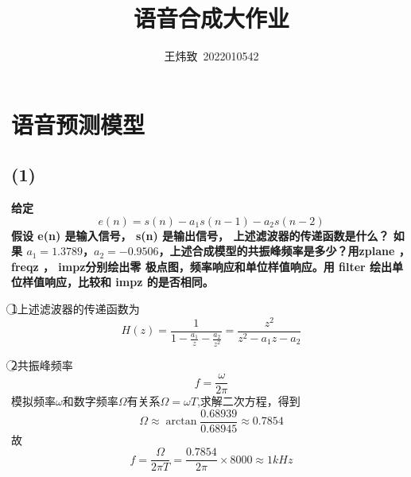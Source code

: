 \documentclass[10pt]{article}
\title{语音合成大作业}
\author{王炜致\ 2022010542}
\date{}
\begin{document}
\maketitle
\section{语音预测模型}
\subsection*{(1)}
\textbf{\color{gray}
给定$$e(n) = s(n) - a_1s(n - 1) - a_2s(n - 2)$$
假设 e(n) 是输入信号， s(n) 是输出信号， 上述滤波器的传递函数是什么？ 如果 $a_1 = 1.3789
$，$a_2 = -0.9506$，上述合成模型的共振峰频率是多少？用zplane ， freqz ， impz分别绘出零
极点图，频率响应和单位样值响应。用 filter 绘出单位样值响应，比较和 impz 的是否相同。}

\textcircled{1}上述滤波器的传递函数为$$H(z)=\frac{1}{1-\frac{a_1}{z}-\frac{a_2}{z^2}} 
=\frac{z^2}{z^2-a_1z-a_2}$$

\textcircled{2}共振峰频率$$f=\frac{\omega}{2\pi}$$
模拟频率$\omega$和数字频率$\Omega$有关系$\Omega=\omega T$,求解二次方程，得到$$\Omega\approx \arctan\frac{0.68939}{0.68945}\approx 0.7854$$
故$$f=\frac{\Omega}{2\pi T}=\frac{0.7854}{2\pi}\times8000\approx1kHz$$
\end{document}
